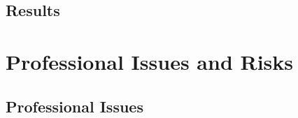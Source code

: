 \documentclass[12pt]{article}
\begin{document}
\subsection{Results}




\section{Professional Issues and Risks}

\subsection{Professional Issues}
\end{document}
